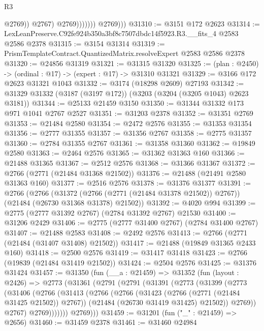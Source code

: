 \begin{lexlean}{R3}
\begin{coremodule}
                              @2769))
                          @2767)
                        @2769)))))))
          @2769)))
@31310 := @3151 @172 @2623
@31314 := LexLeanPreserve.C92fe924b350a3bf8c7507dbdc14f5923.R3.__fits_4 @2583 @2586 @2378
@31315 := @3154 @31314
@31319 := PrismTemplateContract.QuantizedMatrix.resolveExpert @2583 @2586 @2378
@31320 := @24856 @31319
@31321 := @31315 @31320
@31325 := (plan : @2450) -> (ordinal : @17) -> (expert : @17) -> @31310 @31321
@31329 := @3166 @172 @2623 @31321 @1043
@31332 := @3174 (@18298 @2609) @27193
@31342 := @31329 @31332 (@3187 (@3197 @172)) (@3203 (@3204 (@3205 @1043) @2623 @3181))
@31344 := @25133 @21459 @3150
@31350 := @31344 @31332 @173 @971 @1041 @2767 @2527
@31351 := @31203 @2378
@31352 := @31351 @2769
@31353 := @21484 @2580
@31354 := @2472 @2576
@31355 := @31353 @31354
@31356 := @2777 @31355
@31357 := @31356 @2767
@31358 := @2775 @31357
@31360 := @2784 @31355 @2767
@31361 := @31358 @31360
@31362 := @19849 @2580
@31363 := @2464 @2576
@31365 := @31362 @31363 @160
@31366 := @21488 @31365
@31367 := @2512 @2576
@31368 := @31366 @31367
@31372 := @2766 (@2771 (@21484 @31368 @21502))
@31376 := @21488 (@21491 @2580 @31363 @160)
@31377 := @2516 @2576
@31378 := @31376 @31377
@31391 := @2766
    (@2766
      (@31372 (@2766 (@2771 (@21484 @31378 @21502)) @2767))
      (@21484 (@26730 @31368 @31378) @21502))
@31392 := @4020 @994
@31399 := @2775 (@2777 @31392 @2767) (@2784 @31392 @2767) @21530
@31400 := @31206 @2429
@31406 := @2775 (@2777 @31400 @2767) (@2784 @31400 @2767)
@31407 := @21488 @2583
@31408 := @2492 @2576
@31413 := @2766 (@2771 (@21484 (@31407 @31408) @21502))
@31417 := @21488 (@19849 @31365 @2433 @160)
@31418 := @2500 @2576
@31419 := @31417 @31418
@31423 := @2766 (@19839 (@21484 @31419 @21502))
@31424 := @2504 @2576
@31425 := @31376 @31424
@31457 := @31350
    (fun (__a : @21459) =>
    @31352
      (fun (layout : @2426) =>
      @2773
        (@31361
          (@2791
            (@2791
              (@31391
                (@2773
                  (@31399
                    (@2773
                      (@31406
                        (@2766
                          (@31413
                            (@2766
                              (@2766
                                (@31423 (@2766 (@2771 (@21484 @31425 @21502)) @2767))
                                (@21484 (@26730 @31419 @31425) @21502))
                              @2769))
                          @2767)
                        @2769)))))))
          @2769)))
@31459 := @31201 (fun ("_" : @21459) => @2656)
@31460 := @31459 @2378
@31461 := @31460 @24984

\end{coremodule}
\end{lexlean}
